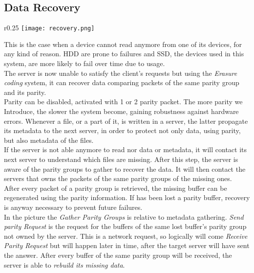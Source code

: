 \subsection{Data Recovery}
\begin{wrapfigure}{r}{0.25\textwidth}
    \centering
    \texttt{[image: recovery.png]}
\end{wrapfigure}

This is the case when a device cannot read anymore from one of its devices, for
any kind of reason. HDD are prone to failures and SSD, the devices used in this
system, are more likely to fail over time due to usage. \\
The server is now unable to satisfy the client's requests
but using the \textit{Erasure coding} system, it can recover data comparing
packets of the same parity group and its parity. \\
Parity can be disabled, activated with 1 or 2 parity packet. The more parity we
Introduce, the slower the system become, gaining robustness against hardware errors.
Whenever a file, or a part of it, is written in a server, the latter propagate
its metadata to the next server, in order to protect not only data, using
parity, but also metadata of the files. \\
If the server is not able anymore to read nor data or metadata, it will contact
its next server to understand which files are missing. After this step, the
server is aware of the parity groups to gather to recover the data. It will then
contact the servers that owns the packets of the same parity groups of the
missing ones. \\
After every packet of a parity group is retrieved, the missing buffer can be
regenerated using the parity information. If has been lost a parity buffer,
recovery is anyway necessary to prevent future failures. \\
In the picture the \textit{Gather Parity Groups} is relative to metadata
gathering. \textit{Send parity Request} is the request for the buffers of the
same lost buffer's parity group not owned by the server. This is a network
request, so logically will come \textit{Receive Parity Request} but will happen
later in time, after the target server will have sent the answer.
After every buffer of the same parity group will be received, the server is able
to \textit{rebuild its missing data}.


